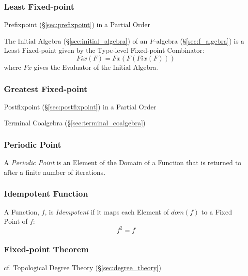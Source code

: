 \subsubsection{Least Fixed-point}\label{sec:least_fixedpoint}

Prefixpoint (\S\ref{sec:prefixpoint}) in a Partial Order

The Initial Algebra (\S\ref{sec:initial_algebra}) of an $F$-algebra
(\S\ref{sec:f_algebra}) is a Least Fixed-point given by the Type-level
Fixed-point Combinator:
\[
  Fix (F) = Fx(F (Fix (F)))
\]
where $Fx$ gives the Evaluator of the Initial Algebra.



\subsubsection{Greatest Fixed-point}\label{sec:greatest_fixedpoint}

Postfixpoint (\S\ref{sec:postfixpoint}) in a Partial Order

Terminal Coalgebra (\S\ref{sec:terminal_coalgebra})



\subsubsection{Periodic Point}\label{sec:periodic_point}

A \emph{Periodic Point} is an Element of the Domain of a Function that
is returned to after a finite number of iterations.



\subsubsection{Idempotent Function}\label{sec:idempotent}

A Function, $f$, is \emph{Idempotent} if it maps each Element of
$dom(f)$ to a Fixed Point of $f$:
\[
  f^2 = f
\]



\subsubsection{Fixed-point Theorem}\label{sec:fixedpoint_theorem}

cf. Topological Degree Theory (\S\ref{sec:degree_theory})



